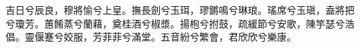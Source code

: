 
\begin{pinyinscope}
吉日兮辰良，穆將愉兮上皇。撫長劍兮玉珥，璆鏘鳴兮琳琅。瑤席兮玉瑱，盍將把兮瓊芳。蕙餚蒸兮蘭藉，奠桂酒兮椒漿。揚枹兮拊鼓，疏緩節兮安歌，陳竽瑟兮浩倡。靈偃蹇兮姣服，芳菲菲兮滿堂。五音紛兮繁會，君欣欣兮樂康。


\end{pinyinscope}